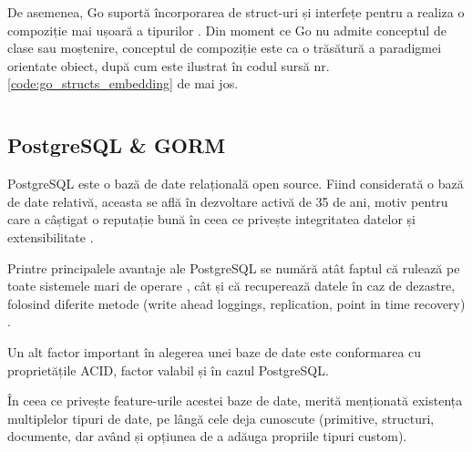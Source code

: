 \begin{code}
    \inputminted[frame=single,framesep=2mm,linenos,breaklines,tabsize=2]{go}{code/go-interfaces.go}
    \label{code:go_interfaces}
\end{code}

De asemenea, Go suportă încorporarea de struct-uri și interfețe pentru a realiza o compoziție mai ușoară a tipurilor \cite{goByExampleStructEmbedding}. Din moment ce Go nu admite conceptul de clase sau moștenire, conceptul de compoziție este ca o trăsătură a paradigmei orientate obiect, după cum este ilustrat în codul sursă nr. \ref{code:go_structs_embedding} de mai jos.

\begin{code}
    \inputminted[frame=single,framesep=2mm,linenos,breaklines,tabsize=2]{go}{code/go-struct-embedding.go}
    \label{code:go_structs_embedding}
\end{code}

\subsection{PostgreSQL \& GORM}

PostgreSQL este o bază de date relațională open source. Fiind considerată o bază de date relativă, aceasta se află în dezvoltare activă de 35 de ani, motiv pentru care a câștigat o reputație bună în ceea ce privește integritatea datelor și extensibilitate \cite{postgresqlAbout}.

Printre principalele avantaje ale PostgreSQL se numără atât faptul că rulează pe toate sistemele mari de operare \cite{postgresqlSupportedPlatforms}, cât și că recuperează datele în caz de dezastre, folosind diferite metode (write ahead loggings, replication, point in time recovery) \cite{postgresqlAbout}.

Un alt factor important în alegerea unei baze de date este conformarea cu proprietățile ACID, factor valabil și în cazul PostgreSQL.

În ceea ce privește feature-urile acestei baze de date, merită menționată existența multiplelor tipuri de date, pe lângă cele deja cunoscute (primitive, structuri, documente, dar având și opțiunea de a adăuga propriile tipuri custom).

